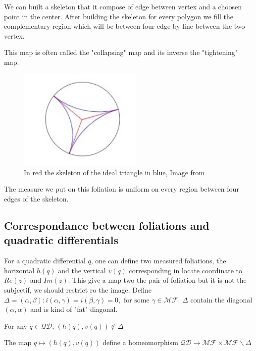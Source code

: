 We can built a skeleton that it compose of edge between vertex and a choosen point in the center. After building the skeleton for every polygon we fill the complementary region which will be between four edge by line between the two vertex.

This map is often called the "collapsing" map and its inverse the "tightening" map.

\begin{figure}[h!]
\centering
\includegraphics[width=6cm]{Image/CollapsingTightening.jpg}
\caption{In red the skeleton of the ideal triangle in blue, Image from \cite{wright2018mirzakhani}}
\end{figure}

The measure we put on this foliation is uniform on every region between four edges of the skeleton.
\subsection{Correspondance between foliations and quadratic differentials}

For a quadratic differential $q$, one can define two measured foliations, the horizontal $h(q)$ and the vertical $v(q)$ corresponding in locate coordinate to $Re(z)$ and $Im(z)$. This give a map two the pair of foliation but it is not the subjectif, we should restrict ro the image.
Define $\Delta = {(\alpha,\beta):i(\alpha,\gamma)=i(\beta,\gamma)=0, \text{ for some }\gamma \in \mathcal{MF}}$. $\Delta$ contain the diagonal $(\alpha,\alpha)$ and is kind of "fat" diagonal.

\begin{lem}
For any $q \in \mathcal{QD}$, $(h(q),v(q)) \notin \Delta$
\end{lem}

\begin{thm}
The map $q \mapsto (h(q),v(q))$ define a homeomorphism $\mathcal{QD} \to \mathcal{MF} \times \mathcal{MF} \backslash \Delta$
\end{thm}


